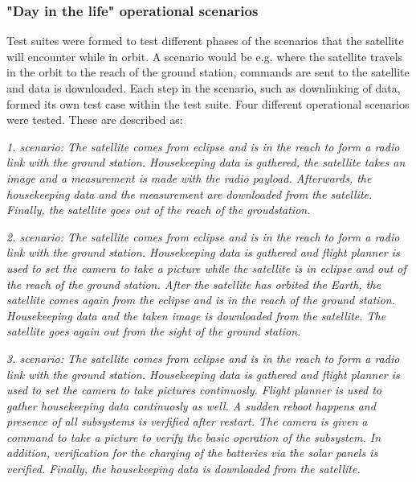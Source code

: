 \documentclass[english,12pt,a4paper,pdftex,elec,utf8]{aaltothesis}
\begin{document}
\subsubsection{"Day in the life" operational scenarios}
Test suites were formed to test different phases of the scenarios that the satellite will encounter while in orbit. A scenario would be e.g. where the satellite travels in the orbit to the reach of the ground station, commands are sent to the satellite and data is downloaded. Each step in the scenario, such as downlinking of data, formed its own test case within the test suite. 
Four different operational scenarios were tested. These are described as:
\\
\par 
\textit{1. scenario: The satellite comes from eclipse and is in the reach to form a radio link with the ground station. Housekeeping data is gathered, the satellite takes an image and a measurement is made with the radio payload. Afterwards, the housekeeping data and the measurement are downloaded from the satellite. Finally, the satellite goes out of the reach of the groudstation.}
\\
\par 
\textit{2. scenario: The satellite comes from eclipse and is in the reach to form a radio link with the ground station. Housekeeping data is gathered and flight planner is used to set the camera to take a picture while the satellite is in eclipse and out of the reach of the ground station. After the satellite has orbited the Earth, the satellite comes again from the eclipse and is in the reach of the ground station. Housekeeping data and the taken image is downloaded from the satellite. The satellite goes again out from the sight of the ground station.}
\\
\par 
\textit{3. scenario: The satellite comes from eclipse and is in the reach to form a radio link with the ground station. Housekeeping data is gathered and flight planner is used to set the camera to take pictures continuosly. Flight planner is used to gather housekeeping data continuosly as well. A sudden reboot happens and presence of all subsystems is verfified after restart. The camera is given a command to take a picture to verify the basic operation of the subsystem. In addition, verification for the charging of the batteries via the solar panels is verified. Finally, the housekeeping data is downloaded from the satellite.}
\\
\par 
\end{document}
